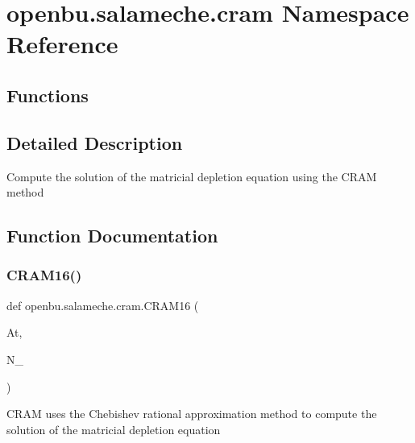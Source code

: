 \hypertarget{namespaceopenbu_1_1salameche_1_1cram}{}\section{openbu.\+salameche.\+cram Namespace Reference}
\label{namespaceopenbu_1_1salameche_1_1cram}
\subsection*{Functions}


\subsection{Detailed Description}
\begin{DoxyVerb}Compute the solution of the matricial depletion equation using the CRAM method\end{DoxyVerb}
 

\subsection{Function Documentation}
\mbox{\label{namespaceopenbu_1_1salameche_1_1cram_a669fd4b90e42c8ce2f944db072d7abc3}} 
\subsubsection{\texorpdfstring{C\+R\+A\+M16()}{CRAM16()}}
{\footnotesize\ttfamily def openbu.\+salameche.\+cram.\+C\+R\+A\+M16 (\begin{DoxyParamCaption}\item[{}]{At,  }\item[{}]{N\+\_ }\end{DoxyParamCaption})}

\begin{DoxyVerb}CRAM uses the Chebishev rational approximation method to compute the solution of the matricial depletion equation\end{DoxyVerb}
 